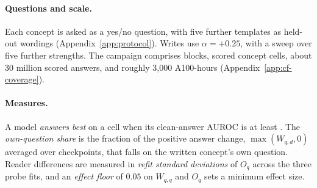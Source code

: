 \paragraph{Questions and scale.}
Each concept is asked as a yes/no question, with five further templates as held-out wordings (Appendix~\ref{app:protocol}). Writes use $\alpha=+0.25$, with a sweep over five further strengths. The campaign comprises \cfBlocks{} blocks, \cfCells{} scored concept cells, about 30 million scored answers, and roughly 3{,}000 A100-hours (Appendix~\ref{app:cf-coverage}).

\paragraph{Measures.}
A model \emph{answers best} on a cell when its clean-answer AUROC is at least \cfStratTopEdge{}. The \emph{own-question share} is the fraction of the positive answer change, $\max(W_{q,d},0)$ averaged over checkpoints, that falls on the written concept's own question. Reader differences are measured in \emph{refit standard deviations} of $O_q$ across the three probe fits, and an \emph{effect floor} of $0.05$ on $W_{q,q}$ and $O_q$ sets a minimum effect size.
